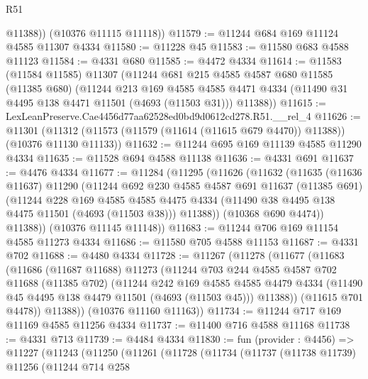 \begin{lexlean}{R51}
\begin{coremodule}
          @11388))
      (@10376 @11115 @11118))
@11579 := @11244 @684 @169 @11124 @4585 @11307 @4334
@11580 := @11228 @45
@11583 := @11580 @683 @4588 @11123
@11584 := @4331 @680
@11585 := @4472 @4334
@11614 := @11583
    (@11584 @11585)
    @11307
    (@11244
      @681
      @215
      @4585
      @4587
      @680
      @11585
      (@11385 @680)
      (@11244
        @213
        @169
        @4585
        @4585
        @4471
        @4334
        (@11490 @31 @4495 @138 @4471 @11501 (@4693 (@11503 @31)))
        @11388))
@11615 := LexLeanPreserve.Cae4456d77aa62528ed0bd9d0612cd278.R51.__rel_4
@11626 := @11301
    (@11312 (@11573 (@11579 (@11614 (@11615 @679 @4470)) @11388)) (@10376 @11130 @11133))
@11632 := @11244 @695 @169 @11139 @4585 @11290 @4334
@11635 := @11528 @694 @4588 @11138
@11636 := @4331 @691
@11637 := @4476 @4334
@11677 := @11284
    (@11295
      (@11626
        (@11632
          (@11635
            (@11636 @11637)
            @11290
            (@11244
              @692
              @230
              @4585
              @4587
              @691
              @11637
              (@11385 @691)
              (@11244
                @228
                @169
                @4585
                @4585
                @4475
                @4334
                (@11490 @38 @4495 @138 @4475 @11501 (@4693 (@11503 @38)))
                @11388))
            (@10368 @690 @4474))
          @11388))
      (@10376 @11145 @11148))
@11683 := @11244 @706 @169 @11154 @4585 @11273 @4334
@11686 := @11580 @705 @4588 @11153
@11687 := @4331 @702
@11688 := @4480 @4334
@11728 := @11267
    (@11278
      (@11677
        (@11683
          (@11686
            (@11687 @11688)
            @11273
            (@11244
              @703
              @244
              @4585
              @4587
              @702
              @11688
              (@11385 @702)
              (@11244
                @242
                @169
                @4585
                @4585
                @4479
                @4334
                (@11490 @45 @4495 @138 @4479 @11501 (@4693 (@11503 @45)))
                @11388))
            (@11615 @701 @4478))
          @11388))
      (@10376 @11160 @11163))
@11734 := @11244 @717 @169 @11169 @4585 @11256 @4334
@11737 := @11400 @716 @4588 @11168
@11738 := @4331 @713
@11739 := @4484 @4334
@11830 := fun (provider : @4456) =>
  @11227
    (@11243
      (@11250
        (@11261
          (@11728
            (@11734
              (@11737
                (@11738 @11739)
                @11256
                (@11244
                  @714
                  @258

\end{coremodule}
\end{lexlean}
